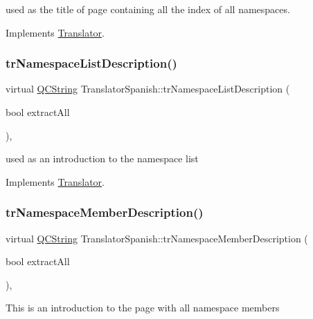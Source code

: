 used as the title of page containing all the index of all namespaces. 

Implements \mbox{\hyperlink{class_translator}{Translator}}.

\mbox{\label{class_translator_spanish_a79769337ce6b480ebb4ec40506ebd217}} 
\subsubsection{\texorpdfstring{trNamespaceListDescription()}{trNamespaceListDescription()}}
{\footnotesize\ttfamily virtual \mbox{\hyperlink{class_q_c_string}{Q\+C\+String}} Translator\+Spanish\+::tr\+Namespace\+List\+Description (\begin{DoxyParamCaption}\item[{bool}]{extract\+All }\end{DoxyParamCaption})\hspace{0.3cm}{\ttfamily [inline]}, {\ttfamily [virtual]}}

used as an introduction to the namespace list 

Implements \mbox{\hyperlink{class_translator}{Translator}}.

\mbox{\label{class_translator_spanish_a3d6dcce7d4467ca39882451769bfcd46}} 
\subsubsection{\texorpdfstring{trNamespaceMemberDescription()}{trNamespaceMemberDescription()}}
{\footnotesize\ttfamily virtual \mbox{\hyperlink{class_q_c_string}{Q\+C\+String}} Translator\+Spanish\+::tr\+Namespace\+Member\+Description (\begin{DoxyParamCaption}\item[{bool}]{extract\+All }\end{DoxyParamCaption})\hspace{0.3cm}{\ttfamily [inline]}, {\ttfamily [virtual]}}

This is an introduction to the page with all namespace members 

